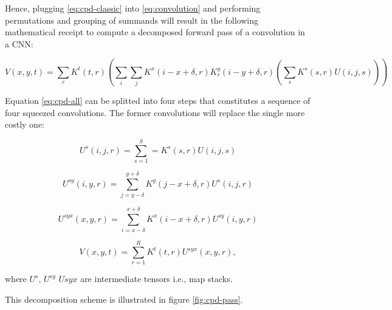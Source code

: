 Hence, plugging \ref{eq:cpd-classic} into \ref{eq:convolution} and performing permutations and grouping of summands will result in the following mathematical receipt to compute a decomposed forward pass of a convolution in a CNN: 

\begin{equation}
\label{eq:cpd-all}
	V(x, y, t)= \sum_r K^t(t,r) \left (\sum_i \sum_j K^x(i-x+\delta, r) K^y_r(i-y+\delta, r) \left (\sum_s 	K^s(s, r) U(i, j, s) \right ) \right ) 
\end{equation}  

Equation \ref{eq:cpd-all} can be splitted into four steps that constitutes a sequence of four squeezed convolutions. The former convolutions will replace the single more costly one: 

\begin{equation}
\label{eq:cpd1}
    U^s(i,j,r) =\sum^{S}_{s=1}=K^s(s,r)U(i,j,s)    
\end{equation}

\begin{equation}
    U^{sy}(i,y,r) = \sum_{j=y-\delta}^{y+\delta} K^y (j-x + \delta,r)U^{s}(i,j,r)
\end{equation}

\begin{equation}
    U^{syx}(x,y,r) = \sum_{i=x-\delta}^{x+\delta} K^x (i-x + \delta,r)U^{sy}(i,y,r)
\end{equation}

\begin{equation}
\label{eq:cpd2}
    V(x,y,t) = \sum_{r=1}^R K^t (t,r) U^{syx}(x,y,r),
\end{equation}

where $U^s$, $U^{sy}$ $U{syx}$ are intermediate tensors i.e., map stacks. 

This decomposition scheme is illustrated in figure \ref{fig:cpd-pass}. 

